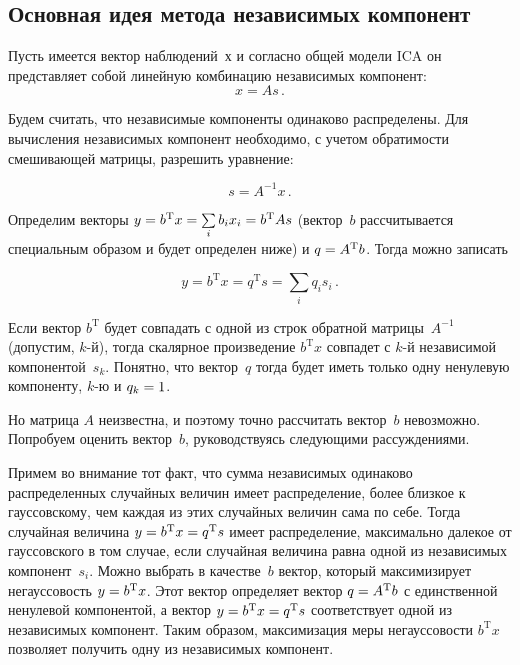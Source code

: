 \begin{multicols}{2}
\vspace*{-8pt}

\subsection{Основная идея метода независимых компонент}

Пусть имеется вектор наблюдений~$х$ и согласно общей модели ICA он
представляет собой линейную комбинацию независимых компонент:
$$
x = A s \,.
$$

Будем считать, что независимые компоненты одинаково распределены.
Для вычисления независимых компонент необходимо, с учетом
обрати\-мости смешивающей матрицы, разрешить уравнение:

\noindent
$$
s = A^{-1}x\,.
$$

Определим векторы $y \hm= b^{\mathrm{T}}x \hm= \sum\limits_{i}b_{i}x_{i} \hm= b^{\mathrm{T}}As$
(вектор~$b$ рассчитывается специальным образом и будет определен
ниже) и $q \hm= A^{\mathrm{T}} b$. Тогда можно записать

\noindent
$$
y = b^{\mathrm{T}}x = q^{\mathrm{T}}s = \sum\limits_{i}q_{i}s_{i}\,.
$$

Если вектор $b^{\mathrm{T}}$ будет совпадать с одной из строк обратной матрицы~$A^{-1}$
(допустим, $k$-й), тогда скалярное произведение $b^{\mathrm{T}}x$
совпадет с $k$-й независимой компонентой~$s_k$. Понятно, что вектор~$q$
тогда будет иметь только одну ненулевую компоненту, $k$-ю и $q_k\hm=1$.

Но матрица $A$ неизвестна, и поэтому точно рассчитать вектор~$b$
невозможно. Попробуем оценить вектор~$b$, руководствуясь следующими
рассуждениями.

Примем во внимание тот факт, что сумма независимых одинаково
распределенных случайных величин имеет распределение, более близкое к
гауссовскому, чем каждая из этих случайных величин сама по себе.
Тогда случайная величина $y \hm= b^{\mathrm{T}}x \hm= q^{\mathrm{T}}s$ имеет
распределение,
максимально далекое от гауссовского в том случае, если случайная
величина равна одной из независимых компонент~$s_i$. Можно выбрать в
качестве~$b$ вектор, который максимизирует негауссовость $y \hm=
b^{\mathrm{T}}x$. Этот вектор определяет вектор $q \hm= A^{\mathrm{T}}b$ с единственной
ненулевой компонентой, а вектор $y \hm= b^{\mathrm{T}}x\hm = q^{\mathrm{T}}s$ соответствует
одной из независимых компонент. Таким образом, максимизация меры
негауссовости $b^{\mathrm{T}}x$ позволяет получить одну из независимых
компонент.


\end{multicols}
